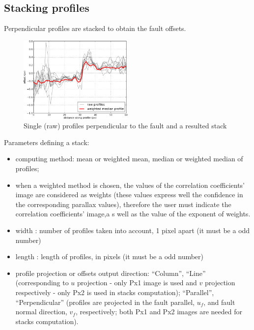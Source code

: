 
\subsection{Stacking profiles}

Perpendicular profiles  are stacked to obtain the fault offsets.

\begin{figure}%
  \begin{center}
  \includegraphics[width=0.5\textwidth]{FIGS/Fdsc/demo_interetStack.png}
  \caption{Single (raw) profiles perpendicular to the fault and a resulted stack}
  \label{FIG:demo_interetStack}
  \end{center}
\end{figure}

Parameters defining a stack:
\begin{itemize}
  \item computing method: mean or weighted mean, median or weighted median of profiles;
  \item when a weighted method is chosen, the values of the correlation coefficients' image are considered as weights (these values express well the confidence in the corresponding parallax values), therefore  the user must indicate the correlation coefficients' image,a s well as the value of the exponent of weights.
  \item width : number of profiles taken into account, 1 pixel apart (it must be a odd number)
  \item length : length of profiles, in pixels (it must be a odd number)
  \item profile projection or offsets output direction: ``Column'', ``Line'' (corresponding to $u$ projection - only Px1 image is used and $v$ projection respectively - only Px2 is used in stacks computation); ``Parallel'', ``Perpendicular'' (profiles are projected in the fault parallel, $u_f$, and fault normal direction, $v_f$, respectively; both Px1 and Px2 images are needed for stacks computation).
\end{itemize}

